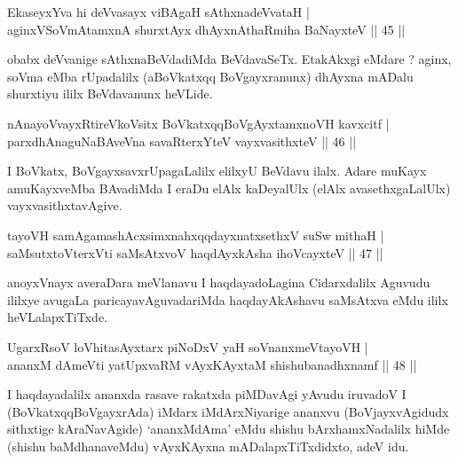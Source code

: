 
\begin{shl}
EkaseyxYva hi deVvasayx viBAgaH sAthxnadeVvataH |\\
aginxVSoVmAtamxnA shurxtAyx dhAyxnAthaRmiha BaNayxteV \hfill || 45 || 
\end{shl}

\begin{artha}
obabx deVvanige sAthxnaBeVdadiMda BeVdavaSeTx. EtakAkxgi eMdare ? aginx, soVma eMba rUpadalilx (aBoVkatxqq BoVgayxranunx) dhAyxna mADalu shurxtiyu ililx BeVdavanunx heVLide.
\end{artha}

\begin{shl}
nAnayoVvayxRtireVkoV\s sitx BoVkatxqqBoVgAyxtamxnoVH kavxcitf |\\
parxdhAnaguNaBAveVna savaRterxYteV vayxvasithxteV \hfill || 46 || 
\end{shl}

\begin{artha}
I BoVkatx, BoVgayxsavxrUpagaLalilx elilxyU BeVdavu ilalx. Adare muKayx amuKayxveMba BAvadiMda I eraDu elAlx kaDeyalUlx (elAlx avasethxgaLalUlx) vayxvasithxtavAgive.
\end{artha}


\begin{shl}
tayoVH samAgamashAcxsimxnahxqqdayxnatxsethxV suSw mithaH |\\
saMsutxtoV\s terxVti saMsAtxvoV haqdAyxkAsha ihoVcayxteV \hfill || 47 || 
\end{shl}

\begin{artha}
anoyxVnayx averaDara meVlanavu I haqdayadoLagina Cidarxdalilx Aguvudu ililxye avugaLa paricayavAguvadariMda haqdayAkAshavu saMsAtxva eMdu ililx heVLalapxTiTxde.
\end{artha}


\begin{shl}
UgarxRsoV loVhitasAyxtarx piNoDxV yaH soV\s nanxmeVtayoVH |\\
ananxM dAmeVti yatUpxvaRM vAyxKAyxtaM shishubanadhxnamf \hfill || 48 || 
\end{shl}

\begin{artha}
I haqdayadalilx ananxda rasave rakatxda piMDavAgi yAvudu iruvadoV I (BoVkatxqqBoVgayxrAda) iMdarx iMdArxNiyarige ananxvu (BoVjayxvAgidudx sithxtige kAraNavAgide) `ananxMdAma' eMdu shishu bArxhamxNadalilx hiMde (shishu baMdhanaveMdu) vAyxKAyxna mADalapxTiTxdidxto, adeV idu.
\end{artha}

